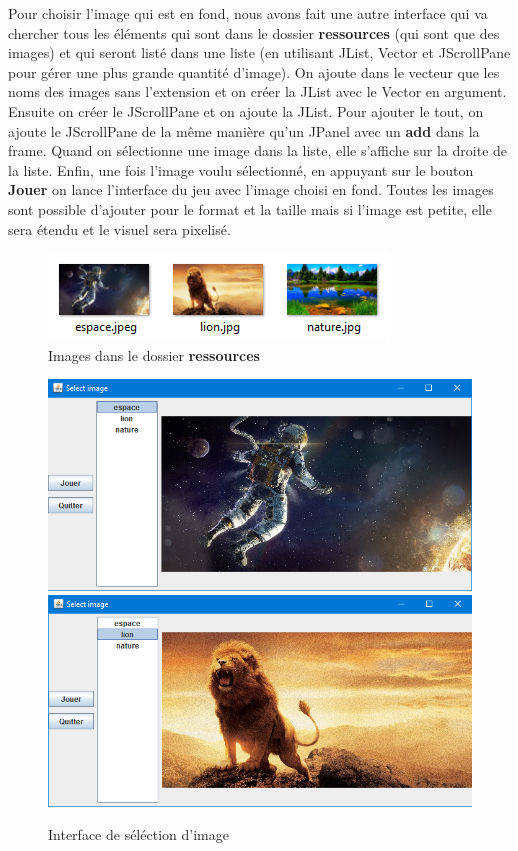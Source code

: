 \documentclass[a4paper,12pt]{article} %
\begin{document}
Pour choisir l'image qui est en fond, nous avons fait une autre interface qui va chercher tous les éléments qui sont dans le dossier \textbf{ressources} (qui sont que des images) et qui seront listé dans une liste (en utilisant JList, Vector et JScrollPane pour gérer une plus grande quantité d'image). On ajoute dans le vecteur que les noms des images sans l'extension et on créer la JList avec le Vector en argument. Ensuite on créer le JScrollPane et on ajoute la JList. Pour ajouter le tout, on ajoute le JScrollPane de la même manière qu'un JPanel avec un \textbf{add} dans la frame. Quand on sélectionne une image dans la liste, elle s'affiche sur la droite de la liste. Enfin, une fois l'image voulu sélectionné, en appuyant sur le bouton \textbf{Jouer} on lance l'interface du jeu avec l'image choisi en fond. Toutes les images sont possible d'ajouter pour le format et la taille mais si l'image est petite, elle sera étendu et le visuel sera pixelisé.

\begin{figure}[!h]
\centering
\includegraphics[scale=0.8]{images/Capture5.PNG}
\caption{Images dans le dossier \textbf{ressources}}
\end{figure}

\begin{figure}[!h]
\centering
\includegraphics[scale=0.6]{images/Capture6.PNG}
\newpage
\vspace{0.1cm}
\includegraphics[scale=0.6]{images/Capture7.PNG}
\caption{Interface de séléction d'image}
\end{figure}
\end{document}
